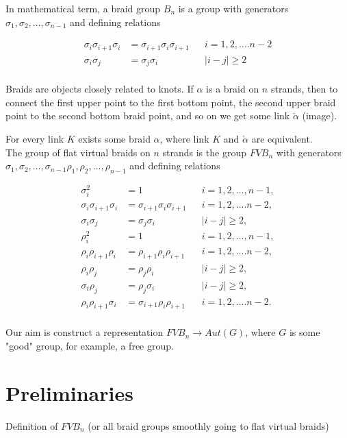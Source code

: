 \documentclass{article}
\begin{document}
In mathematical term, a braid group $B_n$ is a group with generators $\sigma _1,\sigma _2,\dots,\sigma _{n-1}$ and defining relations 

\begin{align*}
\sigma _i\sigma _{i+1}\sigma _i &= \sigma _{i+1}\sigma _i\sigma _{i+1}&&i = 1, 2, \dots. n-2\\
\sigma _i\sigma _j &= \sigma _j\sigma _i&&|i-j|\geqslant   2\\
\end{align*}


Braids are objects closely related to knots. If $\alpha$ is a braid on $n$ strands, then to connect the first upper point to the first bottom point, the second upper braid point to the second bottom braid point, and so on we get some link $\check  \alpha$ (image).

For every link $K$ exists some braid $\alpha$, where link $K$ and $\check  \alpha$ are equivalent.\\


The group of flat virtual braids on $n$ strands is the group $FVB_n$ with generators  $\sigma _1,\sigma _2,\dots,\sigma _{n-1}\rho_1,\rho _2,\dots,\rho _{n-1}$ and defining relations 

\begin{align*}
\sigma_i^2&=1 && i = 1, 2, \dots,n-1,\\
\sigma_i\sigma _{i+1}\sigma _i &= \sigma _{i+1}\sigma _i\sigma _{i+1}&& i = 1, 2, \dots. n-2, \\
\sigma _i\sigma _j &= \sigma _j\sigma _i && |i-j|\geqslant   2,\\
\rho_i^2&=1 &&i = 1, 2, \dots,n-1, \\
\rho_i\rho _{i+1}\rho _i &= \rho _{i+1}\rho_i\rho _{i+1} &&i = 1, 2, \dots. n-2,\\
\rho _i\rho _j &= \rho _j\rho _i && |i-j|\geqslant 2,\\
\sigma _i\rho _j &= \rho _j\sigma _i &&|i-j|\geqslant   2,\\
\rho_i\rho _{i+1}\sigma _i &= \sigma _{i+1}\rho_i\rho _{i+1} && i = 1, 2, \dots. n-2.\\
\end{align*}

Our aim is construct a representation $FVB_n \rightarrow Aut (G)$, where $G$ is some "good" group, for example, a free group.

\section{Preliminaries}
Definition of $FVB_n$ (or all braid groups smoothly going to flat virtual braids)
\end{document}
